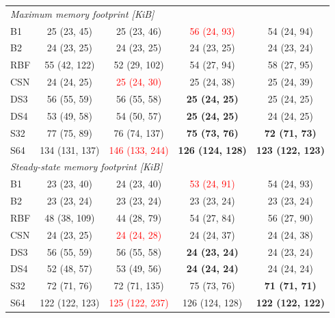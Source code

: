 \begin{table}[htbp]
{\begin{tabular}{l c c c c }
\midrule
\multicolumn{5}{l}{\textit{Maximum memory footprint [KiB]}} \\
B1 & 25 (23, 45) & 25 (23, 46) & \textcolor{red}{56 (24, 93)} & 54 (24, 94) \\
B2 & 24 (23, 25) & 24 (23, 25) & 24 (23, 25) & 24 (23, 24) \\
RBF & 55 (42, 122) & 52 (29, 102) & 54 (27, 94) & 58 (27, 95) \\
CSN & 24 (24, 25) & \textcolor{red}{25 (24, 30)} & 25 (24, 38) & 25 (24, 39) \\
DS3 & 56 (55, 59) & 56 (55, 58) & \textbf{25 (24, 25)} & 25 (24, 25) \\
DS4 & 53 (49, 58) & 54 (50, 57) & \textbf{25 (24, 25)} & 24 (24, 25) \\
S32 & 77 (75, 89) & 76 (74, 137) & \textbf{75 (73, 76)} & \textbf{72 (71, 73)} \\
S64 & 134 (131, 137) & \textcolor{red}{146 (133, 244)} & \textbf{126 (124, 128)} & \textbf{123 (122, 123)} \\
\midrule
\multicolumn{5}{l}{\textit{Steady-state memory footprint [KiB]}} \\
B1 & 23 (23, 40) & 24 (23, 40) & \textcolor{red}{53 (24, 91)} & 54 (24, 93) \\
B2 & 23 (23, 24) & 23 (23, 24) & 23 (23, 24) & 23 (23, 24) \\
RBF & 48 (38, 109) & 44 (28, 79) & 54 (27, 84) & 56 (27, 90) \\
CSN & 24 (23, 25) & \textcolor{red}{24 (24, 28)} & 24 (24, 37) & 24 (24, 38) \\
DS3 & 56 (55, 59) & 56 (55, 58) & \textbf{24 (23, 24)} & 24 (23, 24) \\
DS4 & 52 (48, 57) & 53 (49, 56) & \textbf{24 (24, 24)} & 24 (24, 24) \\
S32 & 72 (71, 76) & 72 (71, 135) & 75 (73, 76) & \textbf{71 (71, 71)} \\
S64 & 122 (122, 123) & \textcolor{red}{125 (122, 237)} & 126 (124, 128) & \textbf{122 (122, 122)} \\
\bottomrule
\end{tabular}
}
\label{tab:mi_validation_cost}
\end{table}

